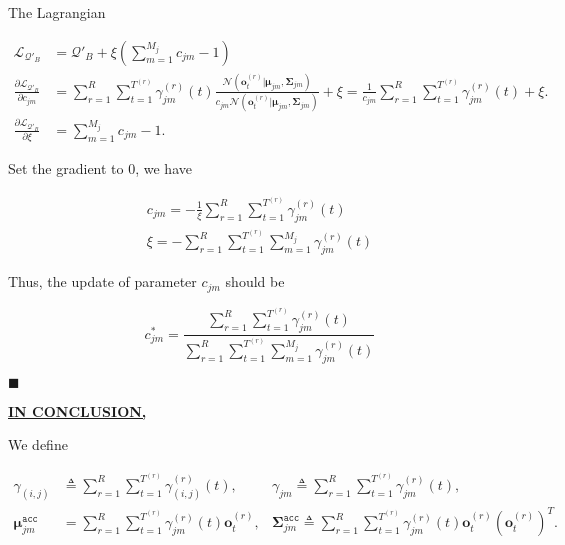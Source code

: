 \documentclass{article}
\renewcommand{\qedsymbol}{\hfill $\blacksquare$\par}
\begin{document}
    \vspace{-0.7em}
    The Lagrangian
    
    \vspace{-2.5em}
    \begin{align*}
        \mathcal{L}_{\mathcal{Q}'_B}&=\mathcal{Q}'_B+\xi\left(\sum_{m=1}^{M_j}c_{jm}-1\right) \\
        \frac{\partial\mathcal{L}_{\mathcal{Q}'_B}}{\partial c_{jm}} &= \sum_{r=1}^R\sum_{t=1}^{T^{(r)}}\gamma_{jm}^{(r)}(t)\frac{\mathcal{N}\left(\mathbf{o}^{(r)}_t|\boldsymbol{\mu}_{jm},\boldsymbol{\Sigma}_{jm}\right)}{c_{jm}\mathcal{N}\left(\mathbf{o}^{(r)}_t|\boldsymbol{\mu}_{jm},\boldsymbol{\Sigma}_{jm}\right)}+\xi = \frac{1}{c_{jm}}\sum_{r=1}^R\sum_{t=1}^{T^{(r)}}\gamma_{jm}^{(r)}(t)+\xi. \\
        \frac{\partial\mathcal{L}_{\mathcal{Q}'_B}}{\partial \xi} &= \sum_{m=1}^{M_j}c_{jm}-1.
    \end{align*}
    
    \vspace{-0.25em}
    Set the gradient to 0, we have
    
    \vspace{-2.7em}
    \begin{align*}
        c_{jm}=-\frac{1}{\xi}\sum_{r=1}^R\sum_{t=1}^{T^{(r)}}\gamma_{jm}^{(r)}(t) \\
        \xi = -\sum_{r=1}^R\sum_{t=1}^{T^{(r)}}\sum_{m=1}^{M_j}\gamma_{jm}^{(r)}(t)
    \end{align*}
    
    Thus, the update of parameter $c_{jm}$ should be
    
    $$c_{jm}^* = \frac{\sum_{r=1}^R\sum_{t=1}^{T^{(r)}}\gamma_{jm}^{(r)}(t)}{\sum_{r=1}^R\sum_{t=1}^{T^{(r)}}\sum_{m=1}^{M_j}\gamma_{jm}^{(r)}(t)}$$
    
    \vspace{-3em}\qedsymbol
    
    
    \vspace{3.9em}
    \underline{\textbf{IN CONCLUSION,}}
    
    We define 
    
    \vspace{-2.5em}
    \begin{align*}
        \gamma_{(i,j)} &\triangleq \sum_{r=1}^R\sum_{t=1}^{T^{(r)}}\gamma_{(i,j)}^{(r)}(t),&\gamma_{jm}\triangleq\sum_{r=1}^R\sum_{t=1}^{T^{(r)}}\gamma_{jm}^{(r)}(t), \\
        \boldsymbol{\mu}_{jm}^{\mathtt{acc}} &= \sum_{r=1}^R\sum_{t=1}^{T^{(r)}}\gamma_{jm}^{(r)}(t)\mathbf{o}_t^{(r)}, &\boldsymbol{\Sigma}_{jm}^{\mathtt{acc}}\triangleq\sum_{r=1}^R\sum_{t=1}^{T^{(r)}}\gamma_{jm}^{(r)}(t)\mathbf{o}_t^{(r)}\left(\mathbf{o}_t^{(r)}\right)^T.
    \end{align*}
    
\end{document}
